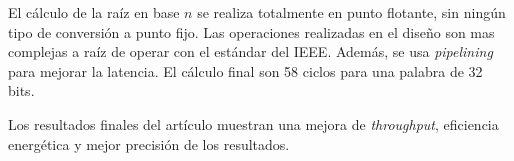 El cálculo de la raíz en base $n$ se realiza totalmente en punto flotante, sin ningún tipo de conversión a punto fijo. Las operaciones realizadas en el diseño son mas complejas a raíz de operar con el estándar del IEEE. Además, se usa \textit{pipelining} para mejorar la latencia. El cálculo final son 58 ciclos para una palabra de 32 bits.

Los resultados finales del artículo muestran una mejora de \textit{throughput}, eficiencia energética y mejor precisión de los resultados. 














